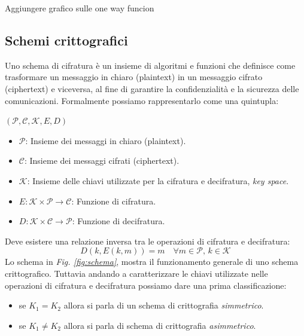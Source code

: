 \begin{center}
    Aggiungere grafico sulle one way funcion
\end{center}

\subsection{Schemi crittografici}
Uno schema di cifratura è un insieme di algoritmi e funzioni che definisce come trasformare un messaggio in chiaro (plaintext) in un messaggio cifrato (ciphertext) e viceversa, al fine di garantire la confidenzialità e la sicurezza delle comunicazioni.
Formalmente possiamo rappresentarlo come una quintupla: 

\begin{center}
    \((\mathcal{P}, \mathcal{C}, \mathcal{K}, E, D)\)
\end{center}

\begin{itemize}
    \item \(\mathcal{P}\): Insieme dei messaggi in chiaro (plaintext).
    \item \(\mathcal{C}\): Insieme dei messaggi cifrati (ciphertext).
    \item \(\mathcal{K}\): Insieme delle chiavi utilizzate per la cifratura e decifratura, \textit{key space}.
    \item \(E: \mathcal{K} \times \mathcal{P} \to \mathcal{C}\): Funzione di cifratura.
    \item \(D: \mathcal{K} \times \mathcal{C} \to \mathcal{P}\): Funzione di decifratura.
\end{itemize}

\noindent
Deve esistere una relazione inversa tra le operazioni di cifratura e decifratura:
\begin{equation}
D(k, E(k, m)) = m \quad \forall m \in \mathcal{P}, \, k \in \mathcal{K}
\end{equation}
\noindent
Lo schema in \textit{Fig. \ref{fig:schema}}, mostra il funzionamento generale di uno schema crittografico. 
Tuttavia andando a caratterizzare le chiavi utilizzate nelle operazioni di cifratura e decifratura possiamo dare una prima classificazione:
\begin{itemize}
    \item se $K_1 = K_2$ allora si parla di un schema di crittografia \textit{simmetrico}.
    \item se $K_1 \neq K_2$ allora si parla di schema di crittografia \textit{asimmetrico}.
\end{itemize}

